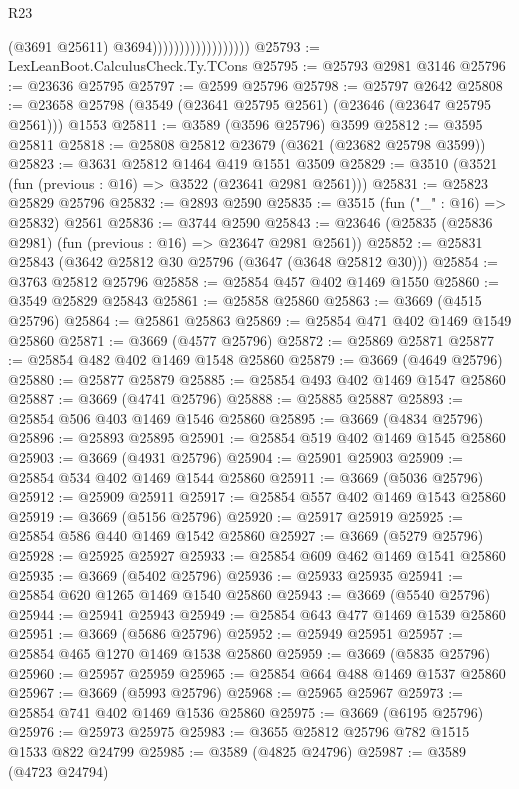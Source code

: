 \begin{lexlean}{R23}
\begin{coremodule}
                                        (@3691 @25611)
                                        @3694))))))))))))))))))
@25793 := LexLeanBoot.CalculusCheck.Ty.TCons
@25795 := @25793 @2981 @3146
@25796 := @23636 @25795
@25797 := @2599 @25796
@25798 := @25797 @2642
@25808 := @23658 @25798 (@3549 (@23641 @25795 @2561) (@23646 (@23647 @25795 @2561))) @1553
@25811 := @3589 (@3596 @25796) @3599
@25812 := @3595 @25811
@25818 := @25808 @25812 @23679 (@3621 (@23682 @25798 @3599))
@25823 := @3631 @25812 @1464 @419 @1551 @3509
@25829 := @3510 (@3521 (fun (previous : @16) => @3522 (@23641 @2981 @2561)))
@25831 := @25823 @25829 @25796
@25832 := @2893 @2590
@25835 := @3515 (fun ("_" : @16) => @25832) @2561
@25836 := @3744 @2590
@25843 := @23646 (@25835 (@25836 @2981) (fun (previous : @16) => @23647 @2981 @2561))
@25852 := @25831 @25843 (@3642 @25812 @30 @25796 (@3647 (@3648 @25812 @30)))
@25854 := @3763 @25812 @25796
@25858 := @25854 @457 @402 @1469 @1550
@25860 := @3549 @25829 @25843
@25861 := @25858 @25860
@25863 := @3669 (@4515 @25796)
@25864 := @25861 @25863
@25869 := @25854 @471 @402 @1469 @1549 @25860
@25871 := @3669 (@4577 @25796)
@25872 := @25869 @25871
@25877 := @25854 @482 @402 @1469 @1548 @25860
@25879 := @3669 (@4649 @25796)
@25880 := @25877 @25879
@25885 := @25854 @493 @402 @1469 @1547 @25860
@25887 := @3669 (@4741 @25796)
@25888 := @25885 @25887
@25893 := @25854 @506 @403 @1469 @1546 @25860
@25895 := @3669 (@4834 @25796)
@25896 := @25893 @25895
@25901 := @25854 @519 @402 @1469 @1545 @25860
@25903 := @3669 (@4931 @25796)
@25904 := @25901 @25903
@25909 := @25854 @534 @402 @1469 @1544 @25860
@25911 := @3669 (@5036 @25796)
@25912 := @25909 @25911
@25917 := @25854 @557 @402 @1469 @1543 @25860
@25919 := @3669 (@5156 @25796)
@25920 := @25917 @25919
@25925 := @25854 @586 @440 @1469 @1542 @25860
@25927 := @3669 (@5279 @25796)
@25928 := @25925 @25927
@25933 := @25854 @609 @462 @1469 @1541 @25860
@25935 := @3669 (@5402 @25796)
@25936 := @25933 @25935
@25941 := @25854 @620 @1265 @1469 @1540 @25860
@25943 := @3669 (@5540 @25796)
@25944 := @25941 @25943
@25949 := @25854 @643 @477 @1469 @1539 @25860
@25951 := @3669 (@5686 @25796)
@25952 := @25949 @25951
@25957 := @25854 @465 @1270 @1469 @1538 @25860
@25959 := @3669 (@5835 @25796)
@25960 := @25957 @25959
@25965 := @25854 @664 @488 @1469 @1537 @25860
@25967 := @3669 (@5993 @25796)
@25968 := @25965 @25967
@25973 := @25854 @741 @402 @1469 @1536 @25860
@25975 := @3669 (@6195 @25796)
@25976 := @25973 @25975
@25983 := @3655 @25812 @25796 @782 @1515 @1533 @822 @24799
@25985 := @3589 (@4825 @24796)
@25987 := @3589 (@4723 @24794)

\end{coremodule}
\end{lexlean}
